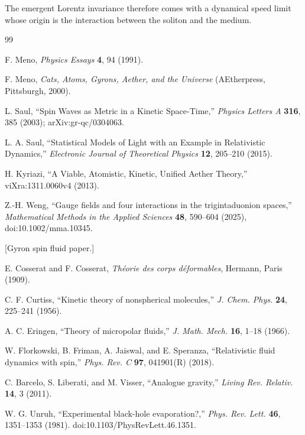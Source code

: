 \documentclass[11pt]{article}
\numberwithin{equation}{section}
\begin{document}
	The emergent Lorentz invariance therefore comes with a dynamical
	speed limit whose origin is the interaction between the soliton and
	the medium.
\begin{thebibliography}{99}

F. Meno, \emph{Physics Essays} \textbf{4}, 94 (1991).

F. Meno, \emph{Cats, Atoms, Gyrons, Aether, and the Universe}
(AEtherpress, Pittsburgh, 2000).

L. Saul, ``Spin Waves as Metric in a Kinetic Space-Time,''
\emph{Physics Letters A} \textbf{316}, 385 (2003);
arXiv:gr-qc/0304063.

L. A. Saul, ``Statistical Models of Light with an Example in
Relativistic Dynamics,'' \emph{Electronic Journal of Theoretical Physics}
\textbf{12}, 205--210 (2015).

H. Kyriazi, ``A Viable, Atomistic, Kinetic, Unified Aether Theory,''
viXra:1311.0060v4 (2013).

Z.-H. Weng, ``Gauge fields and four interactions in the
trigintaduonion spaces,'' \emph{Mathematical Methods in the Applied
Sciences} \textbf{48}, 590--604 (2025), doi:10.1002/mma.10345.

		
		[Gyron spin fluid paper.]
		
		E. Cosserat and F. Cosserat,
		\emph{Th\'eorie des corps d\'eformables},
		Hermann, Paris (1909).
		
		C. F. Curtiss,
		``Kinetic theory of nonspherical molecules,''
		\emph{J. Chem. Phys.} \textbf{24}, 225--241 (1956).
		
		A. C. Eringen,
		``Theory of micropolar fluids,''
		\emph{J. Math. Mech.} \textbf{16}, 1--18 (1966).
		
		W. Florkowski, B. Friman, A. Jaiswal, and E. Speranza,
		``Relativistic fluid dynamics with spin,''
		\emph{Phys. Rev. C} \textbf{97}, 041901(R) (2018).
		
		C. Barcelo, S. Liberati, and M. Visser,
		``Analogue gravity,''
		\emph{Living Rev. Relativ.} \textbf{14}, 3 (2011).
		
	W. G. Unruh,
	``Experimental black-hole evaporation?,''
	\emph{Phys. Rev. Lett.} \textbf{46}, 1351--1353 (1981).
	\newblock doi:10.1103/PhysRevLett.46.1351.


\end{thebibliography}
\end{document}
